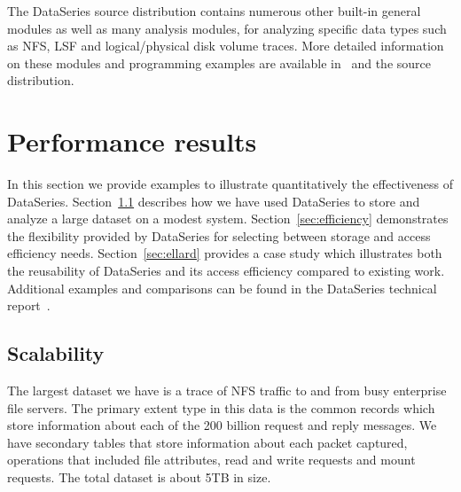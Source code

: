 \documentclass{acm_proc_article-sp}
\begin{document}
The DataSeries source distribution contains numerous other built-in 
general modules as well as many analysis modules, for analyzing
specific data types such as NFS, LSF and logical/physical disk volume
traces.  More detailed information on these modules and programming
examples are available 
in~\cite{DSTechnicalReportSnapshot} and the source distribution.

\section{Performance results}\label{sec:results}


In this section we provide examples to illustrate quantitatively the 
effectiveness of DataSeries.  
Section~\ref{sec:scale} describes how we have used DataSeries to store 
and analyze a large dataset on a modest system.
Section~\ref{sec:efficiency} demonstrates the flexibility provided
by DataSeries for selecting between storage and access efficiency needs.
Section~\ref{sec:ellard} provides a case study which illustrates
both the reusability of DataSeries and its access efficiency compared
to existing work.
Additional examples and comparisons can be found in the
DataSeries technical report~\cite{DSTechnicalReportSnapshot}.

\subsection{Scalability}\label{sec:scale}

The largest dataset we have is a trace of NFS traffic to and from
busy enterprise file servers.
The primary extent type 
in this data is the common records which store information about each
of the 200 billion request and reply messages. We have secondary tables that
store information about each packet captured, operations that included
file attributes, read and write requests and mount requests.  The total dataset
is about 5TB in size.
\end{document}
